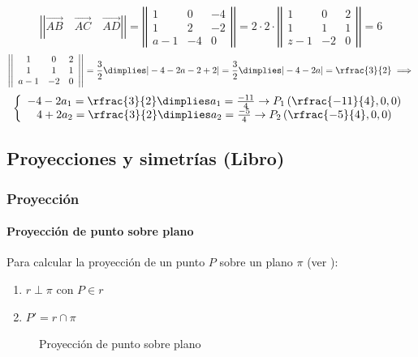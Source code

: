 \begin{problem}[Junio 2019]
\[
\left|\left|\vec{AB}\quad\vec{AC}\quad\vec{AD}\right|\right| = 
\left|\left|\begin{array}{ccc}
1 & 0 & -4\\
1 & 2 & -2\\
a-1 & -4& 0
\end{array}\right|\right| = 2·2·\left|\left|\begin{array}{ccc}
1 & 0 & 2\\
1 & 1 & 1\\
z-1 & -2& 0
\end{array}\right|\right| = {6} 
\]
\[
 \left|\left|\begin{array}{ccc}
1 & 0 & 2\\
1 & 1 & 1\\
a-1 & -2& 0
\end{array}\right|\right| = \frac{3}{2}  \dimplies
|-4 -2a-2+2| = \frac{3}{2}\dimplies |-4-2a| = \rfrac{3}{2} \implies\]
\[
\left\{\begin{array}{c}
-4-2a_1 = \rfrac{3}{2} \dimplies a_1 = \frac{-11}{4} \to P_1\left(\rfrac{-11}{4},0,0\right)\\
4+2a_2 = \rfrac{3}{2} \dimplies a_2 = \frac{-5}{4} \to P_2\left(\rfrac{-5}{4},0,0\right)
\end{array}\right.
\]

\end{problem}


\subsection{Proyecciones y simetrías (Libro)}

\subsubsection{Proyección}

\paragraph{Proyección de punto sobre plano}

Para calcular la proyección de un punto $P$ sobre un plano $\pi$ (ver ):
\begin{enumerate}
  \item $r\perp \pi$ con $P\in r$
  \item $P' = r\cap \pi$
\end{enumerate}

\begin{figure}[hbtp]
\centering
{}

\label{fig::proy::punto-plano}
\caption{Proyección de punto sobre plano}
\end{figure}

